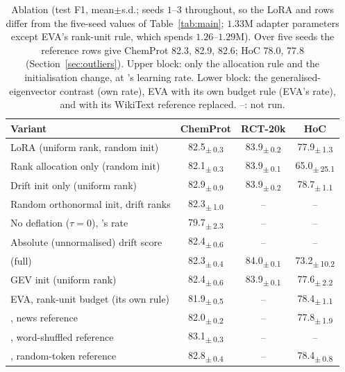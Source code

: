 \begin{table}[t]
\centering
\caption{Ablation (test F1, mean$\pm$s.d.; seeds $1$--$3$ throughout, so the LoRA and \method{} rows differ from the five-seed values of Table~\ref{tab:main}; $1.33$M adapter parameters except EVA's rank-unit rule, which spends $1.26$--$1.29$M). Over five seeds the reference rows give ChemProt 82.3, 82.9, 82.6; HoC 78.0, 77.8 (Section~\ref{sec:outliers}). Upper block: only the allocation rule and the initialisation change, at \method{}'s learning rate. Lower block: the generalised-eigenvector contrast (own rate), EVA with its own budget rule (EVA's rate), and \method{} with its WikiText reference replaced. --: not run.}
\label{tab:ablation}
\footnotesize
\setlength{\tabcolsep}{2.5pt}
\begin{tabular}{lccc}
\toprule
Variant & ChemProt & RCT-20k & HoC \\
\midrule
LoRA (uniform rank, random init) & 82.5\textsubscript{$\pm$\,0.3} & 83.9\textsubscript{$\pm$\,0.2} & 77.9\textsubscript{$\pm$\,1.3} \\
Rank allocation only (random init) & 82.1\textsubscript{$\pm$\,0.3} & 83.9\textsubscript{$\pm$\,0.1} & 65.0\textsubscript{$\pm$\,25.1} \\
Drift init only (uniform rank) & 82.9\textsubscript{$\pm$\,0.9} & 83.9\textsubscript{$\pm$\,0.2} & 78.7\textsubscript{$\pm$\,1.1} \\
Random orthonormal init, drift ranks & 82.3\textsubscript{$\pm$\,1.0} & -- & -- \\
No deflation ($\tau{=}0$), \method{}'s rate & 79.7\textsubscript{$\pm$\,2.3} & -- & -- \\
Absolute (unnormalised) drift score & 82.4\textsubscript{$\pm$\,0.6} & -- & -- \\
\method{} (full) & 82.3\textsubscript{$\pm$\,0.4} & 84.0\textsubscript{$\pm$\,0.1} & 73.2\textsubscript{$\pm$\,10.2} \\
\midrule
GEV init (uniform rank) & 82.4\textsubscript{$\pm$\,0.6} & 83.9\textsubscript{$\pm$\,0.1} & 77.6\textsubscript{$\pm$\,2.2} \\
EVA, rank-unit budget (its own rule) & 81.9\textsubscript{$\pm$\,0.5} & -- & 78.4\textsubscript{$\pm$\,1.1} \\
\method{}, news reference & 82.0\textsubscript{$\pm$\,0.2} & -- & 77.8\textsubscript{$\pm$\,1.9} \\
\method{}, word-shuffled reference & 83.1\textsubscript{$\pm$\,0.3} & -- & -- \\
\method{}, random-token reference & 82.8\textsubscript{$\pm$\,0.4} & -- & 78.4\textsubscript{$\pm$\,0.8} \\
\bottomrule
\end{tabular}
\end{table}
